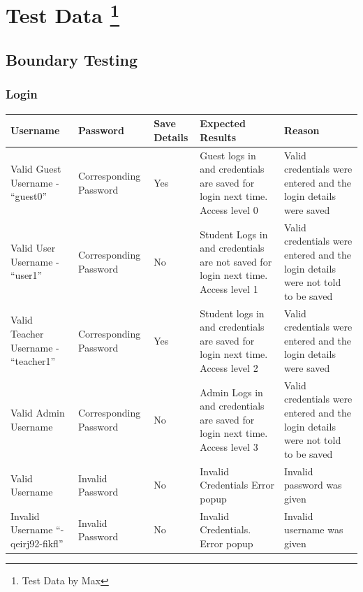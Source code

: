 \documentclass[oneside,openany,11pt,a4paper]{report}
\begin{document}
\section[Test Data]{Test Data \protect\footnote{Test Data by Max}}
\subsection{Boundary Testing}
\subsubsection{Login}

\begin{longtable}{|p{3cm}|p{3cm}|p{3cm}|p{3cm}|p{3cm}|}
	\hline
	\rowcolor{gray!50}
	\textbf{Username} & \textbf{Password} & \textbf{Save Details} & \textbf{Expected Results} & \textbf{Reason}\\ \hline
	Valid Guest Username - “guest0” & Corresponding Password & Yes & Guest logs in and credentials are saved for login next time. Access level 0 & Valid credentials were entered and the login details were saved \\ \hline
	
	Valid User Username - “user1” & Corresponding Password & No & Student Logs in and credentials are not saved for login next time. Access level 1 &  Valid credentials were entered and the login details were not told to be saved \\ \hline
	
Valid Teacher Username - “teacher1” & 	Corresponding Password & Yes & Student logs in and credentials are saved for login next time. Access level 2 & Valid credentials were entered and the login details were saved \\ \hline

Valid Admin Username & Corresponding Password & No & Admin Logs in and credentials are saved for login next time. Access level 3 & Valid credentials were entered and the login details were not told to be saved \\ \hline

Valid Username & Invalid Password & No & Invalid Credentials Error popup & Invalid password was given \\ \hline

Invalid Username “-qeirj92-fikfl” & Invalid Password & No & Invalid Credentials. Error popup & Invalid username was given \\ \hline
	
\end{longtable}
\end{document}
